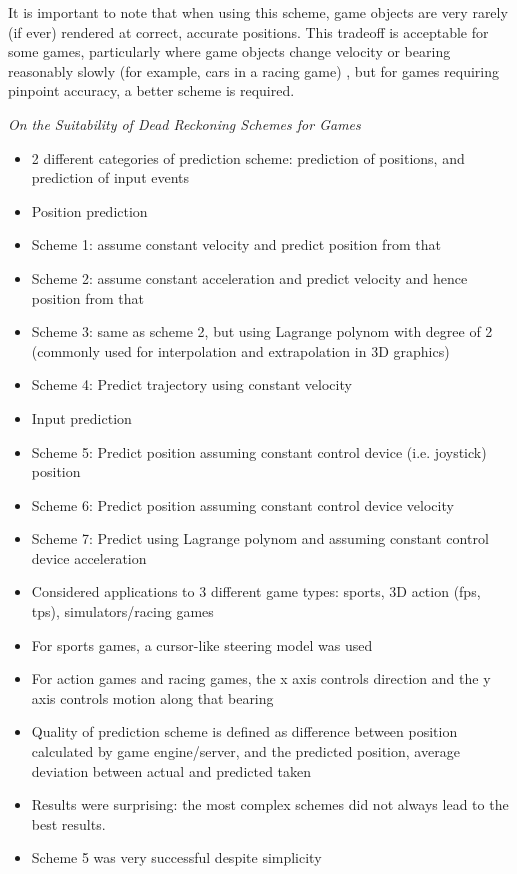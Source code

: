 \documentclass[conference]{IEEEtran}
\begin{document}
	It is important to note that when using this scheme, game objects are very rarely (if ever) rendered at correct, accurate positions. This tradeoff is acceptable for some games, particularly where game objects change velocity or bearing reasonably slowly (for example, cars in a racing game) \cite{pantel2002suitability}, but for games requiring pinpoint accuracy, a better scheme is required.

	\emph{On the Suitability of Dead Reckoning Schemes for Games}

	\begin{itemize}
		\item 2 different categories of prediction scheme: prediction of positions, and prediction of input events
		\item Position prediction
		\item Scheme 1: assume constant velocity and predict position from that
		\item Scheme 2: assume constant acceleration and predict velocity and hence position from that
		\item Scheme 3: same as scheme 2, but using Lagrange polynom with degree of 2 (commonly used for interpolation and extrapolation in 3D graphics)
		\item Scheme 4: Predict trajectory using constant velocity
		\item Input prediction
		\item Scheme 5: Predict position assuming constant control device (i.e. joystick) position
		\item Scheme 6: Predict position assuming constant control device velocity
		\item Scheme 7: Predict using Lagrange polynom and assuming constant control device acceleration
		\item Considered applications to 3 different game types: sports, 3D action (fps, tps), simulators/racing games
		\item For sports games, a cursor-like steering model was used
		\item For action games and racing games, the x axis controls direction and the y axis controls motion along that bearing
		\item Quality of prediction scheme is defined as difference between position calculated by game engine/server, and the predicted position, average deviation between actual and predicted taken
		\item Results were surprising: the most complex schemes did not always lead to the best results.
		\item Scheme 5 was very successful despite simplicity

\end{itemize}
\end{document}

